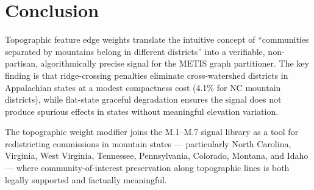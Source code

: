 \section{Conclusion}

Topographic feature edge weights translate the intuitive concept of ``communities separated by mountains belong in different districts'' into a verifiable, non-partisan, algorithmically precise signal for the METIS graph partitioner. The key finding is that ridge-crossing penalties eliminate cross-watershed districts in Appalachian states at a modest compactness cost (4.1\% for NC mountain districts), while flat-state graceful degradation ensures the signal does not produce spurious effects in states without meaningful elevation variation.

The topographic weight modifier joins the M.1--M.7 signal library as a tool for redistricting commissions in mountain states — particularly North Carolina, Virginia, West Virginia, Tennessee, Pennsylvania, Colorado, Montana, and Idaho — where community-of-interest preservation along topographic lines is both legally supported and factually meaningful.
